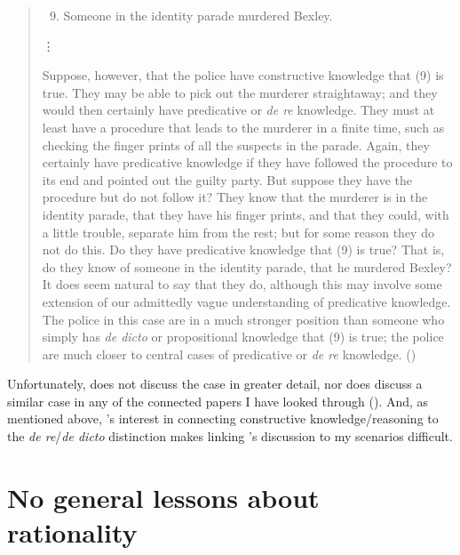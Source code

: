 \documentclass[10pt]{article}
\begin{document}
\begin{quote}
  \begin{enumerate}[label=(\arabic*)]
    \setcounter{enumi}{8}
  \item Someone in the identity parade murdered Bexley.
  \end{enumerate}

  \mbox{}\hfill\vdots\hfill\mbox{}

  Suppose, however, that the police have constructive knowledge that (9) is true.
  They may be able to pick out the murderer straightaway; and they would then certainly have predicative or \emph{de re} knowledge.
  They must at least have a procedure that leads to the murderer in a finite time, such as checking the finger prints of all the suspects in the parade.
  Again, they certainly have predicative knowledge if they have followed the procedure to its end and pointed out the guilty party.
  But suppose they have the procedure but do not follow it?
  They know that the murderer is in the identity parade, that they have his finger prints, and that they could, with a little trouble, separate him from the rest; but for some reason they do not do this.
  Do they have predicative knowledge that (9) is true?
  That is, do they know of someone in the identity parade, that he murdered Bexley?
  It does seem natural to say that they do, although this may involve some extension of our admittedly vague understanding of predicative knowledge.
  The police in this case are in a much stronger position than someone who simply has \emph{de dicto} or propositional knowledge that (9) is true; the police are much closer to central cases of predicative or \emph{de re} knowledge.\nolinebreak
  \mbox{}\hfill\mbox{(\citeyear[143--144]{Over:1983ab})}
\end{quote}

Unfortunately, \citeauthor{Over:1983ab} does not discuss the case in greater detail, nor does \citeauthor{Over:1983ab} discuss a similar case in any of the connected papers I have looked through (\citeyear{Millican:1990aa,Over:1987aa,Over:1986aa,Over:1985aa,Over:1983ab,Over:1983aa}).
And, as mentioned above, \citeauthor{Over:1983ab}'s interest in connecting constructive knowledge/reasoning to the \emph{de re}/\emph{de dicto} distinction makes linking \citeauthor{Over:1983ab}'s discussion to my scenarios difficult.

\section{No general lessons about rationality}
\label{sec:no-general-lessons}
\end{document}
